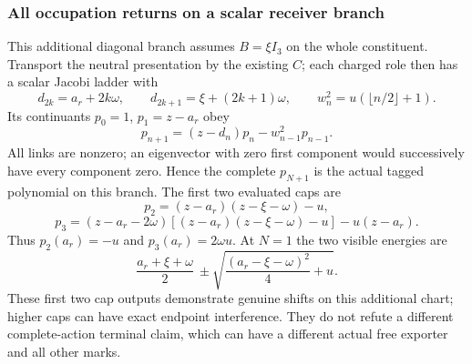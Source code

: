 \documentclass[11pt,a4paper]{article}
\begin{document}
\subsubsection{All occupation returns on a scalar receiver branch}
This additional diagonal branch assumes $B=\xi I_3$ on the whole constituent.
Transport the neutral presentation by the existing $C$; each charged role
then has a scalar Jacobi ladder with
\[
 d_{2k}=a_r+2k\omega,\qquad d_{2k+1}=\xi+(2k+1)\omega,\qquad
 w_n^2=u(\lfloor n/2\rfloor+1).
\]
Its continuants $p_0=1$, $p_1=z-a_r$ obey
\begin{equation}
 \boxed{p_{n+1}=(z-d_n)p_n-w_{n-1}^2p_{n-1}.} \label{p5c:eq:v2169-b13-o9}
\end{equation}
All links are nonzero; an eigenvector with zero first component would
successively have every component zero. Hence the complete $p_{N+1}$ is
the actual tagged polynomial on this branch. The first two evaluated caps are
\[
 p_2=(z-a_r)(z-\xi-\omega)-u,
\]
\[
 p_3=(z-a_r-2\omega)
       [(z-a_r)(z-\xi-\omega)-u]-u(z-a_r).
\]
Thus $p_2(a_r)=-u$ and $p_3(a_r)=2\omega u$.
At $N=1$ the two visible energies are
\[
 \frac{a_r+\xi+\omega}{2}
 \ \pm\sqrt{\frac{(a_r-\xi-\omega)^2}{4}+u}.
\]
These first two cap outputs demonstrate genuine shifts on this additional
chart; higher caps can have exact endpoint interference. They do not refute a different complete-action terminal claim,
which can have a different actual free exporter and all other marks.
\end{document}
